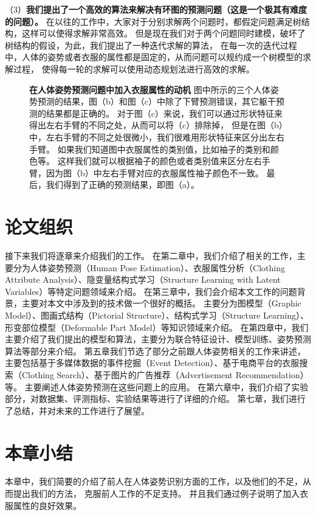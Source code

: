 （3）\textbf{我们提出了一个高效的算法来解决有环图的预测问题（这是一个极其有难度的问题）。}
在以往的工作中，大家对于分别求解两个问题时，都假定问题满足树结构，这样可以使得求解非常高效。 但是现在我们对于两个问题同时建模，破坏了树结构的假设，为此，我们提出了一种迭代求解的算法， 在每一次的迭代过程中，人体的姿势或者衣服的属性都是固定的，从而问题可以规约成一个树模型的求解过程， 使得每一轮的求解可以使用动态规划法进行高效的求解。

\begin{figure}[tbp]
    \centering
    \caption{
    \textbf{在人体姿势预测问题中加入衣服属性的动机}
图中所示的三个人体姿势预测的结果，图（b）和图（c）中除了下臂预测错误，其它躯干预测的结果都是正确的。
对于图（c）来说，我们可以通过形状特征来得出左右手臂的不同之处，从而可以将（c）排除掉，
但是在图（b）中，左右手臂的不同之处很微小，我们很难用形状特征来区分出左右手臂。
如果我们知道图中衣服属性的类别值，比如袖子的类别和颜色等。
这样我们就可以根据袖子的颜色或者类别值来区分左右手臂，因为图（b）中左右手臂对应的衣服属性袖子颜色不一致。
最后，我们得到了正确的预测结果，即图（a）。
    }
    \label{fig:eg}
\end{figure}


\section{论文组织}
接下来我们将逐章来介绍我们的工作。
在第二章中，我们介绍了相关的工作，主要分为人体姿势预测（Human Pose Estimation）、衣服属性分析（Clothing Attribute Analysis）、隐变量结构式学习（Structure Learning with Latent Variables）等特定问题领域来介绍。
在第三章中，我们会介绍本文工作的问题背景，主要对本文中涉及到的技术做一个很好的概括。
主要分为图模型（Graphic Model）、图画式结构（Pictorial Structure）、结构式学习（Structure Learning）、形变部位模型（Deformable Part Model）等知识领域来介绍。
在第四章中，我们主要介绍了我们提出的模型和算法，主要分为联合特征设计、模型训练、姿势预测算法等部分来介绍。
第五章我们节选了部分之前跟人体姿势相关的工作来讲述，主要包括基于多媒体数据的事件挖掘（Event Detection）、基于电商平台的衣服搜索（Clothing Search）、基于图片的广告推荐（Advertisement Recommendation）等。
主要阐述人体姿势预测在这些问题上的应用。
在第六章中，我们介绍了实验部分，对数据集、评测指标、实验结果等进行了详细的介绍。
第七章，我们进行了总结，并对未来的工作进行了展望。

\section{本章小结}
本章中，我们简要的介绍了前人在人体姿势识别方面的工作，以及他们的不足，从而提出我们的方法，
克服前人工作的不足支持。
并且我们通过例子说明了加入衣服属性的良好效果。

